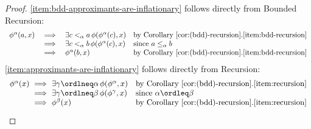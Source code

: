 \begin{proof}
    \ref{item:bdd-approximants-are-inflationary} follows directly from Bounded Recursion:
    \[
    \begin{array}{rcll}
         \phi^\alpha(a,x) & \implies & \exists c<_\alpha a \, \phi(\phi^\alpha(c),x) & \text{by Corollary~\ref{cor:(bdd)-recursion}.\ref{item:bdd-recursion}}\\
         & \implies & \exists c<_\alpha b\, \phi(\phi^\alpha(c),x) & \text{since $a\leq_\alpha b$}\\
         & \implies &\phi^\alpha(b,x) & \text{by Corollary~\ref{cor:(bdd)-recursion}.\ref{item:bdd-recursion}} 
    \end{array}
    \]
\ref{item:approximants-are-inflationary} follows directly from Recursion:
\[
\begin{array}[b]{r@{\ \implies \ }ll}
     \phi^\alpha(x) & \exists \gamma \ordlneq \alpha \, \phi(\phi^\alpha,x) & \text{by Corollary~\ref{cor:(bdd)-recursion}.\ref{item:recursion}}\\
     & \exists \gamma \ordlneq \beta \, \phi(\phi^\gamma, x) & \text{since $\alpha \ordleq \beta$} \\
     & \phi^\beta(x) & \text{by Corollary~\ref{cor:(bdd)-recursion}.\ref{item:recursion}} 
\end{array}
\]

\end{proof}
